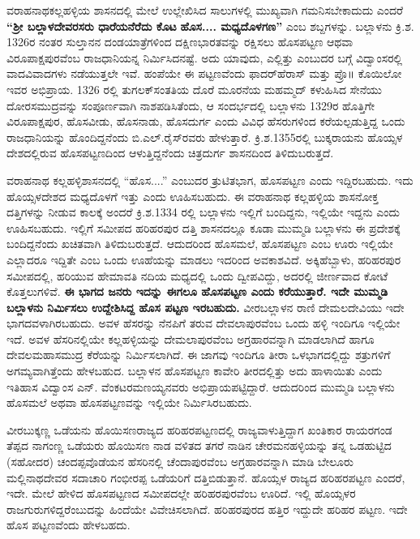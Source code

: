 ವರಾಹನಾಥಕಲ್ಲಹಳ್ಳಿಯ ಶಾಸನದಲ್ಲಿ ಮೇಲೆ ಉಲ್ಲೇಖಿಸಿದ ಸಾಲುಗಳಲ್ಲಿ ಮುಖ್ಯವಾಗಿ ಗಮನಿಸಬೇಕಾದುದು ಎಂದರೆ \textbf{“ಶ‍್ರೀ ಬಲ್ಲಾಳದೇವರಸರು ಧಾರೆಯನೆರೆದು ಕೊಟ} \textbf{ಹೊಸ.... ಮಧ್ಯದೊಳಗಣ” }ಎಂಬ ಶಬ್ದಗಳನ್ನು. ಬಲ್ಲಾಳನು ಕ್ರಿ.ಶ. 1326ರ ನಂತರ ಸುಲ್ತಾನನ ದಂಡಯಾತ್ರೆಗಳಿಂದ ದಕ್ಷಿಣಭಾರತವನ್ನು ರಕ್ಷಿಸಲು ಹೊಸಪಟ್ಟಣ ಆಥವಾ ವಿರೂಪಾಕ್ಷಪುರ\-ವೆಂಬ ರಾಜಧಾನಿಯನ್ನ ನಿರ್ಮಿಸಿದನಷ್ಟೆ. ಅದು ಯಾವುದು, ಎಲ್ಲಿತ್ತು ಎಂಬುದರ ಬಗ್ಗೆ ವಿದ್ವಾಂಸರಲ್ಲಿ ವಾದವಿವಾದಗಳು ನಡೆಯುತ್ತಲೇ ಇವೆ. ಹಂಪೆಯೇ ಈ ಪಟ್ಟಣವೆಂದು ಫಾದರ್​ಹೆರಾಸ್​ ಮತ್ತು ಪ್ರೊ॥ ಕೊಯಿಲೋ ಇವರ ಅಭಿಪ್ರಾಯ. 1326 ರಲ್ಲಿ ತುಗಲಕ್​ ಸಂತತಿಯ ದೊರೆ ಮೂರನೆಯ ಮಹಮ್ಮದ್​ ಕಳುಹಿಸಿದ ಸೇನೆಯು ದೋರಸಮುದ್ರವನ್ನು ಸಂಪೂರ್ಣವಾಗಿ ನಾಶಪಡಿಸಿತೆಂದು, ಆ ಸಂದರ್ಭದಲ್ಲಿ ಬಲ್ಲಾಳನು 1329ರ ಹೊತ್ತಿಗೇ ವಿರೂಪಾಕ್ಷಪುರ, ಹೊಸವೀಡು, ಹೊಸನಾಡು, ಹೊಸದುರ್ಗ ಎಂದು ವಿವಿಧ ಹೆಸರುಗಳಿಂದ ಕರೆಯಲ್ಪಡುತ್ತಿದ್ದ ಒಂದು ರಾಜಧಾನಿಯನ್ನು ಹೊಂದಿದ್ದನೆಂದು ಬಿ.ಎಲ್​.ರೈಸ್​\-ರವರು ಹೇಳುತ್ತಾರೆ. ಕ್ರಿ.ಶ.1355ರಲ್ಲಿ ಬುಕ್ಕರಾಯನು ಹೊಯ್ಸಳ ದೇಶದಲ್ಲಿರುವ ಹೊಸಪಟ್ಟಣದಿಂದ ಆಳುತ್ತಿದ್ದನೆಂದು ಚಿತ್ರದುರ್ಗ ಶಾಸನದಿಂದ ತಿಳಿದುಬರುತ್ತದೆ. 

ವರಾಹನಾಥ ಕಲ್ಲಹಳ್ಳಿಶಾಸನದಲ್ಲಿ “ಹೊಸ....” ಎಂಬುದರ ತ್ರುಟಿತಭಾಗ, ಹೊಸಪಟ್ಟಣ ಎಂದು ಇದ್ದಿರಬಹುದು. ಇದು ಹೊಯ್ಸಳದೇಶದ ಮಧ್ಯದೊಳಗೆ ಇತ್ತು ಎಂದು ಊಹಿಸಬಹುದು. ಈ ವರಾಹನಾಥ ಕಲ್ಲಹಳ್ಳಿಯ ಶಾಸನೋಕ್ತ ದತ್ತಿಗಳನ್ನು ನೀಡುವ ಕಾಲಕ್ಕೆ ಅಂದರೆ ಕ್ರಿ.ಶ.1334 ರಲ್ಲಿ ಬಲ್ಲಾಳನು ಇಲ್ಲಿಗೆ ಬಂದಿದ್ದನು, ಇಲ್ಲಿಯೇ ಇದ್ದನು ಎಂದು ಊಹಿಸಬಹುದು. ಇಲ್ಲಿಗೆ ಸಮೀಪದ ಹರಿಹರಪುರ ದತ್ತಿ ಶಾಸನದಲ್ಲೂ ಕೂಡಾ ಮುಮ್ಮಡಿ ಬಲ್ಲಾಳನು ಈ ಪ್ರದೇಶಕ್ಕೆ ಬಂದಿದ್ದನೆಂದು ಖಚಿತವಾಗಿ ತಿಳಿದುಬರುತ್ತದೆ. ಆದುದರಿಂದ ಹೊಸಮಲೆ, ಹೊಸಪಟ್ಟಣ ಎಂಬ ಊರು ಇಲ್ಲಿಯೇ ಎಲ್ಲಾದರೂ ಇದ್ದಿತೇ ಎಂಬ ಒಂದು ಊಹೆಯನ್ನು ಮಾಡಲು ಇದರಿಂದ ಅವಕಾಶವಿದೆ. ಅಕ್ಕಿಹೆಬ್ಬಾಳು, ಹರಿಹರಪುರ ಸಮೀಪದಲ್ಲಿ, ಹರಿಯುವ ಹೇಮಾವತಿ ನದಿಯ ಮಧ್ಯದಲ್ಲಿ ಒಂದು ದ್ವೀಪವಿದ್ದು, ಅದರಲ್ಲಿ ಜೀರ್ಣವಾದ ಕೋಟೆ ಕೊತ್ತಲುಗಳಿವೆ. \textbf{ಈ ಭಾಗದ ಜನರು ಇದನ್ನು ಈಗಲೂ ಹೊಸಪಟ್ಟಣ ಎಂದು ಕರೆಯುತ್ತಾರೆ. ಇದೇ ಮುಮ್ಮಡಿ ಬಲ್ಲಾಳನು ನಿರ್ಮಿಸಲು ಉದ್ದೇಶಿಸಿದ್ದ ಹೊಸ ಪಟ್ಟಣ ಇರಬಹುದು.} ವೀರಬಲ್ಲಾಳನ ರಾಣಿ ದೇಮಲದೇವಿಯು ಇದೇ ಭಾಗದವಳಾಗಿರಬಹುದು. ಅವಳ ಹೆಸರನ್ನು ನೆನಪಿಗೆ ತರುವ ದೇವಲಾಪುರವೆಂಬ ಒಂದು ಹಳ್ಳಿ ಇಂದಿಗೂ ಇಲ್ಲಿಯೇ ಇದೆ. ಅವಳ ಹೆಸರಿನಲ್ಲಿಯೇ ಕಲ್ಲಹಳ್ಳಿಯನ್ನು ದೇಮಲಾಪುರವೆಂಬ ಅಗ್ರಹಾರವನ್ನಾಗಿ ಮಾಡಲಾಗಿದೆ ಹಾಗೂ ದೇವಲಮಹಾಸಮುದ್ರ ಕೆರೆಯನ್ನು ನಿರ್ಮಿಸಲಾಗಿದೆ. ಈ ಜಾಗವು ಇಂದಿಗೂ ತೀರಾ ಒಳಭಾಗದಲ್ಲಿದ್ದು ಶತ್ರುಗಳಿಗೆ ಅಗಮ್ಯವಾಗಿತ್ತೆಂದು ಹೇಳಬಹುದ. ಬಲ್ಲಾಳನ ಹೊಸಪಟ್ಟಣ ಕಾವೇರಿ ತೀರದಲ್ಲಿತ್ತು ಅದು ಹಾಳಾಯಿತು ಎಂದು ಇತಿಹಾಸ ವಿದ್ವಾಂಸ ಎನ್​. ವೆಂಕಟರಮಣಯ್ಯನವರು ಅಭಿಪ್ರಾಯಪಟ್ಟಿದ್ದಾರೆ. ಆದುದರಿಂದ ಮುಮ್ಮಡಿ ಬಲ್ಲಾಳನು ಹೊಸಮಲೆ ಅಥವಾ ಹೊಸಪಟ್ಟಣವನ್ನು ಇಲ್ಲಿಯೇ ನಿರ್ಮಿಸಿರಬಹುದು. 

ವೀರಬುಕ್ಕಣ್ಣ ಒಡೆಯನು ಹೊಯಿಸಣರಾಜ್ಯದ ಹರಿಹರಪಟ್ಟಣದಲ್ಲಿ ರಾಜ್ಯವಾಳುತ್ತಿದ್ದಾಗ ಖಂತಿಕಾರ ರಾಯರಗಂಡ ತೆಪ್ಪದ ನಾಗಂಣ್ಣ ಒಡೆಯರು ಹೊಯಿಸಣ ನಾಡ ವಳಿತದ ತಗರೆ ನಾಡಿನ ಚೇರಮನಹಳ್ಳಿಯನ್ನು ತನ್ನ ಒಡಹುಟ್ಟಿದ (ಸಹೋದರ) ಚಂದಪ್ಪವೊಡೆಯನ ಹೆಸರಿನಲ್ಲಿ ಚೆಂದಾಪುರವೆಂಬ ಅಗ್ರಹಾರವನ್ನಾಗಿ ಮಾಡಿ ಬೇಲೂರು ಮಲ್ಲಿನಾಥದೇವರ ಸದಾಚಾರಿ ಗಂಭೀರಪ್ಪ ಒಡೆಯರಿಗೆ ದತ್ತಿಬಿಡುತ್ತಾನೆ. ಹೊಯ್ಸಳ ರಾಜ್ಯದ ಹರಿಹರಪಟ್ಟಣ ಎಂದರೆ, ಇದೇ. ಮೇಲೆ ಹೇಳಿದ ಹೊಸಪಟ್ಟಣದ ಸಮೀಪದಲ್ಲೇ ಹರಿಹರಪುರವೆಂಬ ಊರಿದೆ. ಇಲ್ಲಿ ಹೊಯ್ಸಳರ ರಾಜಗುರುಗಳಿದ್ದರೆಂಬುದನ್ನು ಹಿಂದೆಯೇ ವಿವೇಚಿಸಲಾಗಿದೆ. ಹರಿಹರಪುರದ ಹತ್ತಿರ ಇದ್ದುದೇ ಹರಿಹರ ಪಟ್ಟಣ. ಇದೇ ಹೊಸ ಪಟ್ಟಣವೆಂದು ಹೇಳಬಹದು. 


